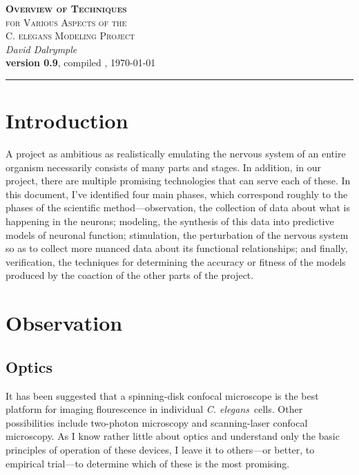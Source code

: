 \documentclass[letter,11pt]{article}
\newcommand{\cel}{{\em C. elegans}}
\begin{document}
\begin{center}
  \textsc{\LARGE \textbf{Overview of Techniques} \\[0.5mm] for Various Aspects of the \\[2.8mm] C. elegans Modeling Project}\\[3mm]
	\textit{\Large David Dalrymple}\\[2mm]
  {\large \textbf{version 0.9}, compiled \currenttime, \today\\[0mm]}
	\rule[2mm]{0.66\textwidth}{0.25mm}
\end{center}

\section*{Introduction}

A project as ambitious as realistically emulating the nervous system of an entire organism
necessarily consists of many parts and stages. In addition, in our project, there are
multiple promising technologies that can serve each of these. In this document, I've
identified four main phases, which correspond roughly to the phases of the scientific
method---observation, the collection of data about what is happening in the neurons;
modeling, the synthesis of this data into predictive models of neuronal function;
stimulation, the perturbation of the nervous system so as to collect more nuanced
data about its functional relationships; and finally, verification, the techniques
for determining the accuracy or fitness of the models produced by the coaction
of the other parts of the project.

\tableofcontents

\section{Observation}


\subsection{Optics}
\label{optics1}

It has been suggested that a spinning-disk confocal microscope is the best
platform for imaging flourescence in individual \cel\ cells.  Other
possibilities include two-photon microscopy and scanning-laser confocal
microscopy. As I know rather little about optics and understand only the basic
principles of operation of these devices, I leave it to others---or better, to
empirical trial---to determine which of these is the most promising.
\end{document}
